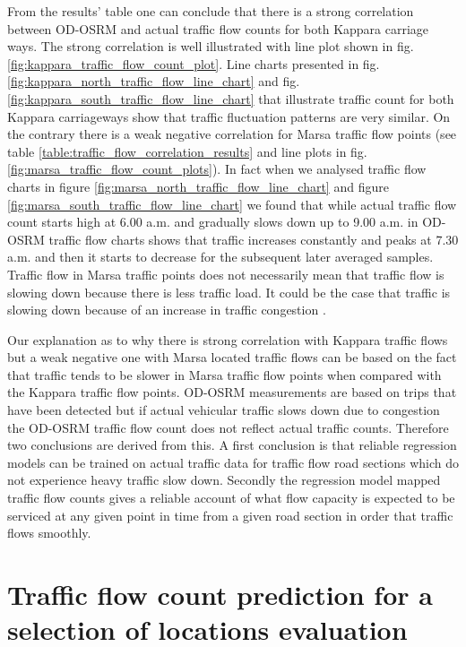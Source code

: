 \documentclass[12pt, a4paper]{report}
\theoremstyle{definition}
\theoremstyle{definition}%
\theoremstyle{definition}%
\theoremstyle{definition}%
\theoremstyle{definition}%
\theoremstyle{definition}%
\begin{document}
From the results' table one can conclude that there is a strong correlation between OD-OSRM and actual traffic flow counts for both Kappara carriage ways. The strong correlation is well illustrated with line plot shown in fig. \ref{fig:kappara_traffic_flow_count_plot}. Line charts presented in fig. \ref{fig:kappara_north_traffic_flow_line_chart} and fig. \ref{fig:kappara_south_traffic_flow_line_chart} that illustrate traffic count for both Kappara carriageways show that traffic fluctuation patterns are very similar. On the contrary there is a weak negative correlation for Marsa traffic flow points (see table \ref{table:traffic_flow_correlation_results} and line plots in fig. \ref{fig:marsa_traffic_flow_count_plots}). In fact when we analysed traffic flow charts in figure \ref{fig:marsa_north_traffic_flow_line_chart} and figure \ref{fig:marsa_south_traffic_flow_line_chart}  we found that while actual traffic flow count starts high at 6.00 a.m. and gradually slows down up to 9.00 a.m. in OD-OSRM traffic flow charts shows that traffic increases constantly and peaks at 7.30 a.m. and then it starts to decrease for the subsequent later averaged samples. Traffic flow in Marsa traffic points does not necessarily mean that traffic flow is slowing down because there is less traffic load. It could be the case that traffic is slowing down because of an increase in traffic congestion \cite{Pace2017}.

Our explanation as to why there is strong correlation with Kappara traffic flows but a weak negative one with Marsa located traffic flows can be based on the fact that traffic tends to be slower in Marsa traffic flow points when compared with the Kappara traffic flow points. OD-OSRM measurements are based on trips that have been detected but if actual vehicular traffic slows down due to congestion the OD-OSRM traffic flow count does not reflect actual traffic counts. Therefore two conclusions are derived from this. A first conclusion is that reliable regression models can be trained on actual traffic data for traffic flow road sections which do not experience heavy traffic slow down.  Secondly the regression model mapped traffic flow counts gives a reliable account of what flow capacity is expected to be serviced at any given point in time from a given road section in order that traffic flows smoothly. 

\section{Traffic flow count prediction for a selection of locations evaluation}
\end{document}
